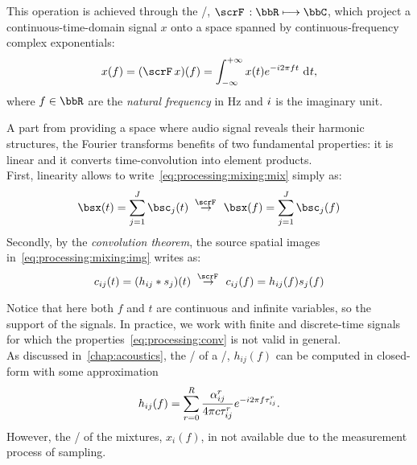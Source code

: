 This operation is achieved through the \FTdef/, $\fourierTrans{}:\bbR\kmapsto\bbC$, which
project a continuous-time-domain signal $x$ onto a space spanned by continuous-frequency complex exponentials:
\begin{equation}\label{eq:processing:ft}
    x(f) = (\fourierTrans{x})(f) =
        \int_{-\infty}^{+\infty}
        x(t)
        \cste^{-\csti 2 \pi f t}
        \,\kdiff{t}
    ,
\end{equation}
where $f \in \bbR$ are the \textit{natural frequency} in $\si{\Hz}$ and ${i}$ is the imaginary unit.

A part from providing a space where audio signal reveals their harmonic structures, the Fourier transforms benefits of two fundamental properties:
it is linear and it converts time-convolution into element products.
\\First, linearity allows to write~\cref{eq:processing:mixing:mix} simply as:
\begin{equation}\label{eq:processing:ft:mix}
    \mics( t) = \sum_{\idxSrc=1}^{\numSrcs} \imgs_\idxSrc( t)
    \;\overset{\fourierTrans{}}{\rightarrow}\;
    \mics( f) = \sum_{\idxSrc=1}^{\numSrcs} \imgs_\idxSrc( f)
\end{equation}
Secondly, by the \textit{convolution theorem}, the source spatial images in~\cref{eq:processing:mixing:img} writes as:
\begin{equation}\label{eq:processing:conv}
    \img_{\idxMic\idxSrc}( t) =  \kparen{h_{\idxMic\idxSrc} \conv \src_\idxSrc} ( t)
    \;\overset{\fourierTrans{}}{\rightarrow}\;
    \img_{\idxMic\idxSrc}( f) =  h_{\idxMic\idxSrc}( f) \src_\idxSrc( f)
\end{equation}

Notice that here both $f$ and $t$ are continuous and infinite variables, so the support of the signals.
In practice, we work with finite and discrete-time signals for which the properties~\eqref{eq:processing:conv} is not valid in general.
\\As discussed in~\cref{chap:acoustics}, the \FT/ of a \RIR/, $h_{ij}( f)$
can be computed in closed-form with some approximation
\begin{equation}\label{eq:processing:rir:ft}
    h_{ij}( f) = \sum_{r=0}^{R}
                    \frac{\alpha_{ij}^r}{4 \pi c \tau_{ij}^r}
                    {e}^{- {i} 2 \pi f \tau_{ij}^r}
    .
\end{equation}
However, the \FT/ of the mixtures, $x_i( f)$, in not available due to the measurement process of sampling.

